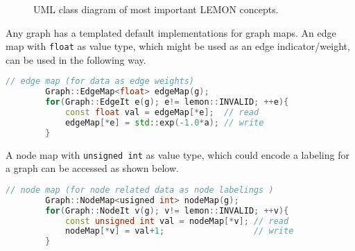 \begin{figure}[H]
\begin{center}
    \end{center}
    \caption{
        UML class diagram of most important LEMON concepts.
    }\label{fig:uml_lemon_graph_concepts}
    \end{figure}






        Any graph has a templated default implementations for graph maps.
        An edge map with \lstinline{float} as value type, which might
        be used as an edge indicator/weight, can be 
        used in the following way.

        \begin{minipage}{\textwidth}\vspace{-0.75cm}\begin{lstlisting}[language=c++]
        // edge map (for data as edge weights)
        Graph::EdgeMap<float> edgeMap(g); 
        for(Graph::EdgeIt e(g); e!= lemon::INVALID; ++e){
            const float val = edgeMap[*e];  // read
            edgeMap[*e] = std::exp(-1.0*a); // write
        }
        \end{lstlisting}\end{minipage}\vspace{0.5cm}

        A node map with  \lstinline{unsigned int} as value type,
        which could encode a labeling for a graph 
        can be accessed as shown below.

        \begin{minipage}{\textwidth}\vspace{-0.75cm}\begin{lstlisting}[language=c++]
        // node map (for node related data as node labelings )
        Graph::NodeMap<usigned int> nodeMap(g);
        for(Graph::NodeIt v(g); v!= lemon::INVALID; ++v){
            const unsigned int val = nodeMap[*v]; // read
            nodeMap[*v] = val+1;                  // write
        }
        \end{lstlisting}\end{minipage}\vspace{0.5cm}


